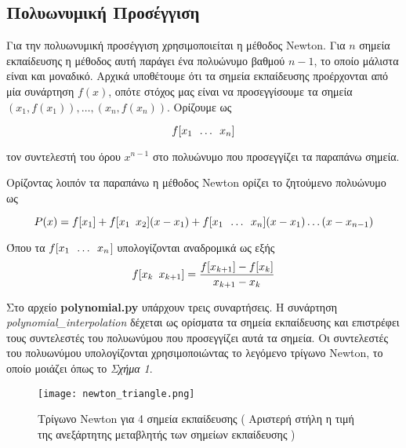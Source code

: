 \documentclass[Second Project.tex]{subfiles}
\begin{document}
\subsection{ Πολυωνυμική Προσέγγιση }

Για την πολυωνυμική προσέγγιση χρησιμοποιείται η μέθοδος \textlatin{Newton}. Για $n$ σημεία 
εκπαίδευσης η μέθοδος αυτή παράγει ένα πολυώνυμο βαθμού $n-1$, το οποίο μάλιστα είναι και μοναδικό. 
Αρχικά υποθέτουμε ότι τα σημεία εκπαίδευσης προέρχονται από μία συνάρτηση $f(x)$, οπότε στόχος μας 
είναι να προσεγγίσουμε τα σημεία $(x_{1},f(x_{1})),\dots,(x_{n},f(x_{n}))$. Ορίζουμε ως 

\begin{equation*}
    f[x_{1} \hspace{5px}\dots\hspace{5px} x_{n}] 
\end{equation*}

τον συντελεστή του όρου $x^{n-1}$ στο πολυώνυμο που προσεγγίζει τα παραπάνω σημεία.

Ορίζοντας λοιπόν τα παραπάνω η μέθοδος \textlatin{Newton} ορίζει το ζητούμενο πολυώνυμο ως

\begin{equation*}
P(x) = f[x_{1}] + f[x_{1} \hspace{5px}x_{2}](x-x_{1}) + f[x_{1}\hspace{5px} \dots \hspace{5px} x_{n}](x-x_{1}) \dots (x-x_{n-1}) 
\end{equation*}

Όπου τα $f[x_{1}\hspace{5px} \dots \hspace{5px}x_{n}$] υπολογίζονται αναδρομικά ως εξής
\begin{equation*}
    f[x_{k} \hspace{5px} x_{k+1}] = \frac{f[x_{k+1}] - f[x_{k}]}{x_{k+1}-x_{k}}
\end{equation*}

Στο αρχείο \textlatin{\textbf{polynomial.py}} υπάρχουν τρεις συναρτήσεις. Η συνάρτηση \textlatin{\textit{polynomial\_interpolation}} δέχεται ως 
ορίσματα τα σημεία εκπαίδευσης και επιστρέφει τους συντελεστές του πολυωνύμου που προσεγγίζει αυτά τα σημεία. Οι συντελεστές του πολυωνύμου 
υπολογίζονται χρησιμοποιώντας το λεγόμενο τρίγωνο \textlatin{Newton}, το οποίο μοιάζει όπως το \textit{Σχήμα 1}. 

\vspace{5px}
\begin{figure}[h!]
    \centering
    \captionsetup{justification=centering}
    \begin{center}
        \texttt{[image: newton\_triangle.png]}    
        \caption{ Τρίγωνο \textlatin{Newton} για 4 σημεία εκπαίδευσης ( Αριστερή στήλη η τιμή της ανεξάρτητης μεταβλητής των σημείων 
                                                                        εκπαίδευσης ) }
    \end{center}
\end{figure}
\end{document}

